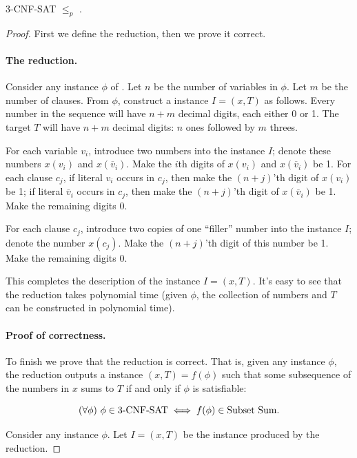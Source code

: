 \documentclass[11pt]{article}
\begin{document}
\begin{lemma}
  3-CNF-SAT ${} \le_p {}$ . 
\end{lemma}
\begin{proof} First we define the reduction, then we prove it correct.

  \paragraph{The reduction.}
  Consider any instance $\phi$ of .
  Let $n$ be the number of variables in $\phi$.
  Let $m$ be the number of clauses.
  From $\phi$, construct a  instance $I=(x,T)$ as follows.
  Every number in the sequence will have $n+m$ decimal digits,
  each either 0 or 1.
  The target $T$ will have $n+m$ decimal digits:
  $n$ ones followed by $m$ threes.

  For each variable $v_i$, introduce two numbers into the instance $I$;
  denote these numbers $x(v_i)$ and $x(\overline v_i)$. 
  Make the $i$th digits of $x(v_i)$ and $x(\overline v_i)$ be 1.
  For each clause $c_j$,
  if literal $v_i$ occurs in $c_j$,
  then make the $(n+j)$'th digit of $x(v_i)$ be 1;
  if literal $\overline v_i$ occurs in $c_j$,
  then make the $(n+j)$'th digit of $x(\overline v_i)$ be 1. 
  Make the remaining digits 0.

  For each clause $c_j$, introduce two copies of one ``filler'' number into the instance $I$;
  denote the number $x(c_j)$.
  Make the $(n+j)$'th digit of this number be 1. 
  Make the remaining digits 0.
  
  This completes the description of the  instance $I=(x,T)$.
  It's easy to see that the reduction takes polynomial time 
  (given $\phi$, the collection of numbers and $T$ can be constructed in polynomial time).

  \paragraph{Proof of correctness.}
  To finish we prove that the reduction is correct.
  That is, given any  instance $\phi$,
  the reduction outputs a  instance $(x,T)=f(\phi)$
  such that
  some subsequence of the numbers in $x$ sums to $T$
  if and only if
  $\phi$ is satisfiable:

  \[(\forall \phi)~ \phi\in \prob{3-CNF-SAT} \iff f(\phi) \in \prob{Subset Sum}.\]
  
  Consider any  instance $\phi$.
  Let $I=(x,T)$ be the  instance produced by the reduction. 


\end{proof}
\end{document}
